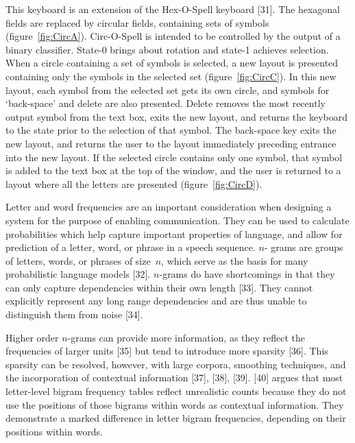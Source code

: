 \documentclass[12pt,titlepage]{article}
\begin{document}
This keyboard is an extension of the Hex-O-Spell keyboard [31].  The hexagonal fields are replaced by 
circular fields, containing sets of symbols (figure~\ref{fig:CircA}).  Circ-O-Spell is intended to be controlled by the 
output of a binary classifier.  State-0 brings about rotation and state-1 achieves selection.  When a circle 
containing a set of symbols is selected, a new layout is presented containing only the symbols in the 
selected set (figure~\ref{fig:CircC}).  In this new layout, each symbol from the selected set gets its own circle, and 
symbols for `back-space' and delete are also presented.  Delete removes the most recently output 
symbol from the text box, exits the new layout, and returns the keyboard to the state prior to the 
selection of that symbol.  The back-space key exits the new layout, and returns the user to the layout 
immediately preceding entrance into the new layout.  If the selected circle contains only one symbol, 
that symbol is added to the text box at the top of the window, and the user is returned to a layout where 
all the letters are presented (figure~\ref{fig:CircD}).

Letter and word frequencies are an important consideration when designing a system for the purpose of 
enabling communication.  They can be used to calculate probabilities which help capture important 
properties of language, and allow for prediction of a letter, word, or phrase in a speech sequence.  $n$- 
grams are groups of letters, words, or phrases of size~$n$, which serve as the basis for many probabilistic 
language models [32].  $n$-grams do have shortcomings in that they can only capture dependencies within 
their own length [33].  They cannot explicitly represent any long range dependencies and are thus unable 
to distinguish them from noise [34].

Higher order $n$-grams can provide more information, as they reflect the frequencies of larger units [35] 
but tend to introduce more sparsity [36].  This sparsity can be resolved, however, with large corpora, 
smoothing techniques, and the incorporation of contextual information [37], [38], [39].  [40] argues that most letter-level
bigram frequency tables reflect unrealistic counts because they do not use the positions of  those 
bigrams within words as contextual information.  They demonstrate a marked difference in letter 
bigram frequencies, depending on their positions within words.
\end{document}
